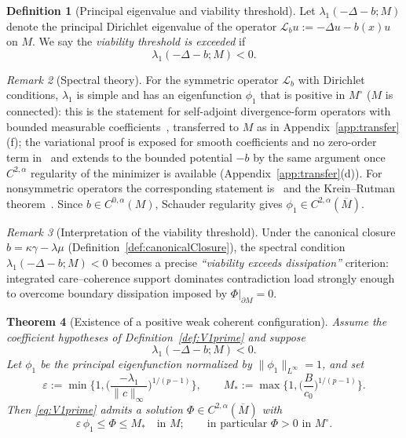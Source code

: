 \documentclass[11pt]{article}
\theoremstyle{plain}
\newtheorem{theorem}{Theorem}[section]
\theoremstyle{definition}
\newtheorem{definition}[theorem]{Definition}
\theoremstyle{remark}
\newtheorem{remark}[theorem]{Remark}
\begin{document}
\begin{definition}[Principal eigenvalue and viability threshold]\label{def:lambda1}
Let \(\lambda_1(-\Delta - b;M)\) denote the principal Dirichlet eigenvalue of the operator
\(\mathcal{L}_b u := -\Delta u - b(x)u\) on \(M\).
We say the \emph{viability threshold is exceeded} if
\[
\lambda_1(-\Delta - b;M) < 0.
\]
\end{definition}

\begin{remark}[Spectral theory]
For the symmetric operator \(\mathcal L_b\) with Dirichlet conditions, \(\lambda_1\) is simple and has an eigenfunction \(\phi_1\) that is positive in \(M^\circ\) (\(M\) is connected): this is the statement for self-adjoint divergence-form operators with bounded measurable coefficients~\cite[Thm.~8.38]{GilbargTrudinger2001}, transferred to \(M\) as in Appendix~\ref{app:transfer}(f); the variational proof is exposed for smooth coefficients and no zero-order term in~\cite[\S6.5.1, Thm.~2]{Evans2010} and extends to the bounded potential \(-b\) by the same argument once \(C^{2,\alpha}\) regularity of the minimizer is available (Appendix~\ref{app:transfer}(d)). For nonsymmetric operators the corresponding statement is~\cite[\S6.5.2, Thm.~3]{Evans2010} and the Krein--Rutman theorem~\cite{KreinRutman1948}. Since \(b\in C^{0,\alpha}(M)\), Schauder regularity gives \(\phi_1\in C^{2,\alpha}(\overline M)\).
\end{remark}

\begin{remark}[Interpretation of the viability threshold]\label{rem:viabilityInterpretation}
Under the canonical closure \(b=\kappa\gamma-\lambda\mu\) (Definition~\ref{def:canonicalClosure}), the spectral condition
\(\lambda_1(-\Delta - b;M)<0\) becomes a precise \emph{``viability exceeds dissipation''} criterion:
integrated care--coherence support dominates contradiction load strongly enough to overcome boundary dissipation imposed by \(\Phi|_{\partial M}=0\).
\end{remark}

\begin{theorem}[Existence of a positive weak coherent configuration]\label{thm:nontrivialV1prime}
Assume the coefficient hypotheses of Definition~\ref{def:V1prime} and suppose
\[
\lambda_1(-\Delta - b;M) < 0.
\]
Let \(\phi_1\) be the principal eigenfunction normalized by \(\|\phi_1\|_{L^\infty}=1\), and set
\[
\varepsilon:=\min\Big\{1,\Big(\frac{-\lambda_1}{\|c\|_\infty}\Big)^{1/(p-1)}\Big\},\qquad
M_\ast:=\max\Big\{1,\Big(\frac{B}{c_0}\Big)^{1/(p-1)}\Big\}.
\]
Then \eqref{eq:V1prime} admits a solution \(\Phi\in C^{2,\alpha}(\overline M)\) with
\[
\varepsilon\,\phi_1\le\Phi\le M_\ast\quad\text{in }M;\qquad\text{in particular }\Phi>0\text{ in }M^\circ .
\]
\end{theorem}
\end{document}

